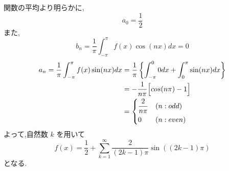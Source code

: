 \documentclass[uplatex,11pt,fleqn]{jsarticle}
\begin{document}
\noindent
\mbox{関数の平均より明らかに,}
\[
  a_0=\frac{1}{2}
\]
\mbox{また,}
\[
 b_n=\frac{1}{\pi}\int_{-\pi}^\pi f(x)\cos(nx)dx=0
\]
\begin{align}
 a_n=\frac{1}{\pi}\int_{-\pi}^\pi f(x)\sin(nx)dx
 &=\frac{1}{\pi} \left\{ \int_{-\pi}^0 0dx+\int_0^\pi \sin(nx)dx \right\} \nonumber \\
 &=-\frac{1}{n\pi} \Bigl[cos(n\pi)-1\Bigr] \nonumber \\ 
 &=\begin{dcases}
   \frac{2}{n\pi} & (n:odd) \nonumber \\
   0 & (n:even)
 \end{dcases}
\end{align}
\mbox{よって,自然数} $ k $ \mbox{を用いて}
  \[
f(x)=\frac{1}{2}+\sum_{k=1}^{\infty}\frac{2}{(2k-1)\pi}\sin((2k-1)\pi)
\]
\mbox{となる.}
\end{document}
